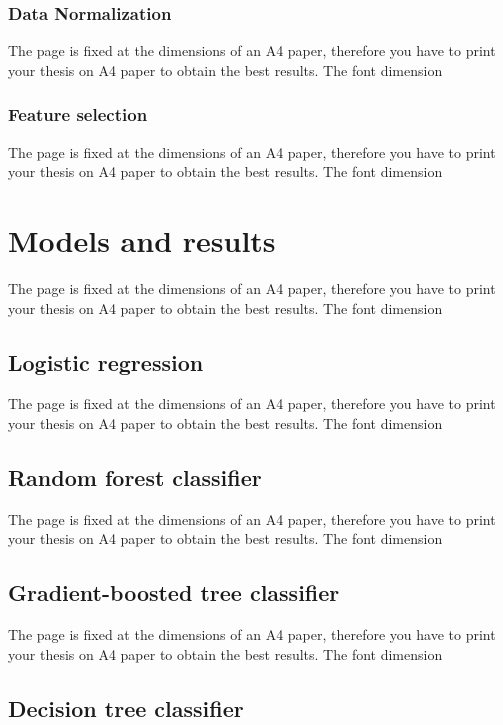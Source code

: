 \documentclass[LaM,binding=0.6cm, english]{sapthesis}
\begin{document}
\subsection{Data Normalization}

The page is fixed at the dimensions of an A4 paper, therefore you have to print your thesis on A4 paper to obtain the best results. The font dimension

\subsection{Feature selection}

The page is fixed at the dimensions of an A4 paper, therefore you have to print your thesis on A4 paper to obtain the best results. The font dimension

\chapter{Models and results}

The page is fixed at the dimensions of an A4 paper, therefore you have to print your thesis on A4 paper to obtain the best results. The font dimension

\section{Logistic regression}

The page is fixed at the dimensions of an A4 paper, therefore you have to print your thesis on A4 paper to obtain the best results. The font dimension

\section{Random forest classifier}

The page is fixed at the dimensions of an A4 paper, therefore you have to print your thesis on A4 paper to obtain the best results. The font dimension

\section{Gradient-boosted tree classifier}

The page is fixed at the dimensions of an A4 paper, therefore you have to print your thesis on A4 paper to obtain the best results. The font dimension

\section{Decision tree classifier}
\end{document}
